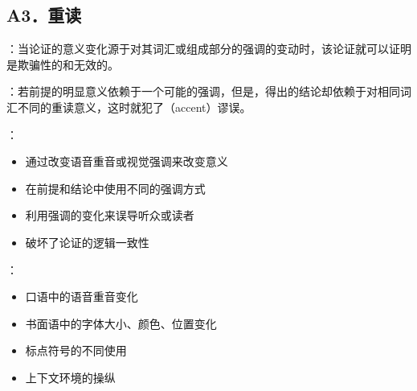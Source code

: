 \subsection{A3．重读}

\begin{theorembox}[title=重读谬误的定义]
：当论证的意义变化源于对其词汇或组成部分的强调的变动时，该论证就可以证明是欺骗性的和无效的。

：若前提的明显意义依赖于一个可能的强调，但是，得出的结论却依赖于对相同词汇不同的重读意义，这时就犯了（accent）谬误。

：
\begin{itemize}
  \item 通过改变语音重音或视觉强调来改变意义
  \item 在前提和结论中使用不同的强调方式
  \item 利用强调的变化来误导听众或读者
  \item 破坏了论证的逻辑一致性
\end{itemize}

：
\begin{itemize}
  \item 口语中的语音重音变化
  \item 书面语中的字体大小、颜色、位置变化
  \item 标点符号的不同使用
  \item 上下文环境的操纵
\end{itemize}
\end{theorembox}

